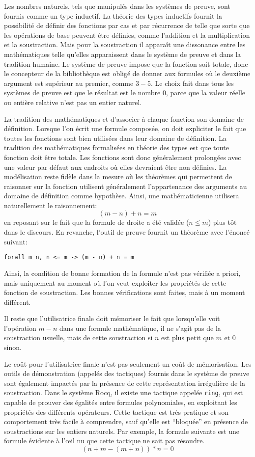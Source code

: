 \documentclass{modjflart}
\begin{document}
Les nombres naturels, tels que manipulés dans les systèmes de preuve,
sont fournis comme un type inductif.  La théorie des types inductifs
fournit la possibilité de définir des fonctions par cas et par
récurrence de telle que sorte
que les opérations de base peuvent être définies, comme l'addition et
la multiplication et la soustraction.  Mais pour la soustraction
il apparaît une dissonance entre les
mathématiques telle qu'elles apparaissent dans le système de preuve et
dans la tradition humaine.  Le système de preuve impose
que la fonction soit totale, donc le concepteur de la bibliothèque est
obligé de donner aux formules où le deuxième argument est supérieur au
premier, comme \(3 - 5\).  Le choix fait
dans tous les systèmes de preuve est que le résultat est le nombre
\(0\), parce que la valeur réelle ou entière relative n'est pas un
entier naturel.

La tradition des mathématiques et d'associer à chaque fonction son
domaine de définition.  Lorsque l'on écrit une formule composée, on
doit expliciter le fait que toutes les fonctions sont bien utilisées
dans leur domaine de définition.  La tradition des mathématiques
formalisées en théorie des types est que toute fonction doit être
totale.  Les fonctions sont donc généralement prolongées avec une valeur
par défaut aux endroits où elles devraient être
non définies.  La modélisation reste fidèle dans la mesure où les
théorèmes qui permettent de raisonner sur la fonction utilisent
généralement l'appartenance des arguments au domaine de définition
comme hypothèse.  Ainsi, une mathématicienne utilisera naturellement
le raisonnement:
\[(m - n) + n = m\]
en reposant sur le fait que la formule de droite a été validée (\(n
\leq m\)) plus tôt dans le discours.  En revanche, l'outil de preuve
fournit un théorème avec l'énoncé suivant:
\begin{verbatim}
forall m n, n <= m -> (m - n) + n = m
\end{verbatim}
Ainsi, la condition de bonne formation de la formule n'est pas
vérifiée a priori, mais uniquement au moment où l'on veut exploiter
les propriétés de cette fonction de soustraction.  Les bonnes
vérifications sont faites, mais à un moment différent.

Il reste que l'utilisatrice finale doit mémoriser le fait que
lorsqu'elle voit l'opération \(m - n\) dans une formule mathématique,
il ne s'agit pas de la soustraction usuelle, mais de cette
soustraction si \(n\) est plus petit que \(m\) et 0 sinon.

Le coût pour l'utilisatrice finale n'est pas seulement un coût de
mémorisation.  Les outils de démonstration (appelés des tactiques)
fournis dans le système de preuve sont également impactés par la
présence de cette représentation irrégulière de la soustraction.
Dans le système Rocq, il existe une tactique appelée \texttt{ring}, qui
est capable de prouver des égalités entre formules polynomiales, en
exploitant les propriétés des différents opérateurs.  Cette tactique
est très pratique et son comportement très facile à comprendre, sauf
qu'elle est ``bloquée'' en présence de soustractions sur les entiers
naturels.  Par exemple, la formule suivante est une formule évidente à
l'œil nu que cette tactique ne sait pas résoudre.
\[(n + m - (m + n)) * n = 0\]
\end{document}

